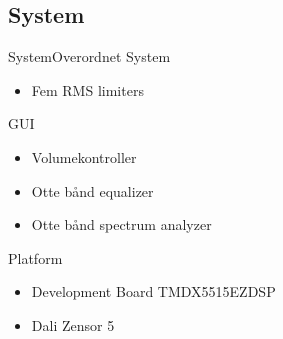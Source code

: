 \subsection{System}
\begin{frame}{System}{Overordnet}
	System
	\begin{itemize}
	\item Fem RMS limiters
	\end{itemize}
	GUI
	\begin{itemize}
	\item Volumekontroller
	\item Otte bånd equalizer
	\item Otte bånd spectrum analyzer
	\end{itemize}
	Platform
	\begin{itemize}
	\item Development Board TMDX5515EZDSP
	\item Dali Zensor 5
	\end{itemize}
\end{frame}

